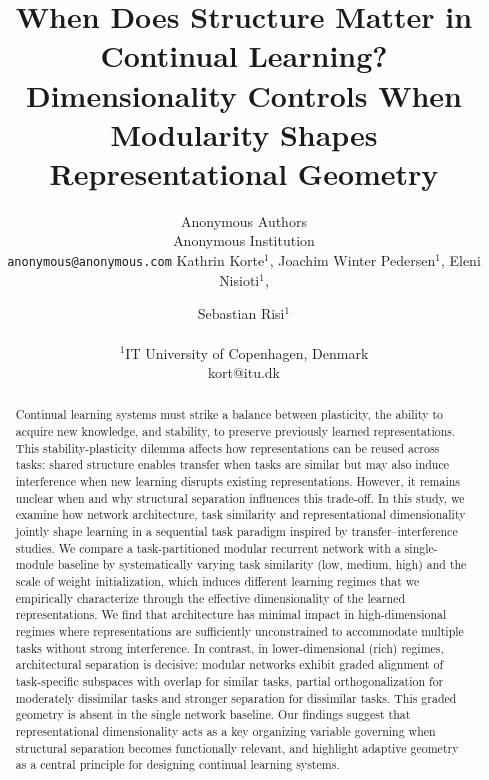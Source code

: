 \documentclass[letterpaper]{article}
\title{When Does Structure Matter in Continual Learning? Dimensionality Controls When Modularity Shapes Representational Geometry}
\author{
\ifanonymous
    Anonymous Authors \\
    Anonymous Institution \\
    \texttt{anonymous@anonymous.com}
\else
    Kathrin Korte$^{1}$,
    Joachim Winter Pedersen$^{1}$,
    Eleni Nisioti$^{1}$, \and
    Sebastian Risi$^{1}$ \\
    \mbox{}\\
    $^1$IT University of Copenhagen, Denmark \\
    kort@itu.dk
\fi
}
\begin{document}
\maketitle

\begin{abstract}
 
        
        Continual learning systems must strike a balance between plasticity, the ability to acquire new knowledge, and stability, to preserve previously learned representations. This stability-plasticity dilemma affects how representations can be reused across tasks: shared structure enables transfer when tasks are similar but may also induce interference when new learning disrupts existing representations. However, it remains unclear when and why structural separation influences this trade-off. In this study, we examine how network architecture, task similarity and representational dimensionality jointly shape learning in a sequential task paradigm inspired by transfer–interference studies. We compare a task-partitioned modular recurrent network with a single-module baseline by systematically varying task similarity (low, medium, high) and the scale of weight initialization, which induces different learning regimes that we empirically characterize through the effective dimensionality of the learned representations. We find that architecture has minimal impact in high-dimensional regimes where representations are sufficiently unconstrained to accommodate multiple tasks without strong interference. In contrast, in lower-dimensional (rich) regimes, architectural separation is decisive: modular networks exhibit graded alignment of task-specific subspaces with overlap for similar tasks, partial orthogonalization for moderately dissimilar tasks and stronger separation for dissimilar tasks. This graded geometry is absent in the single network baseline. Our findings suggest that representational dimensionality acts as a key organizing variable governing when structural separation becomes functionally relevant, and highlight adaptive geometry as a central principle for designing continual learning systems.




\end{abstract}
\end{document}
